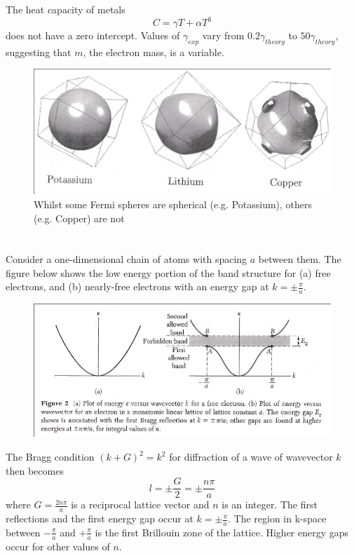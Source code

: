 \documentclass[a4paper, 11pt, normalem]{report}
\begin{document}
The heat capacity of metals
\begin{equation}
    C = \gamma T + \alpha T^3
\end{equation}
does not have a zero intercept.
Values of $\gamma_{exp}$ vary from $0.2\gamma_{theory}$ to $50\gamma_{theory}$, suggesting that $m$, the electron mass, is a variable. 
\begin{figure}[H]
    \centering
    \includegraphics[scale=0.4]{spheres.png}
    \caption{Whilst some Fermi spheres are spherical (e.g. Potassium), others (e.g. Copper) are not}
\end{figure}

\chapter{}
Consider a one-dimensional chain of atoms with spacing $a$ between them. 
The figure below shows the low energy portion of the band structure for (a) free electrons, and (b) nearly-free electrons with an energy gap at $k = \pm \frac{\pi}{a}$.
\begin{figure}[H]
    \centering
    \includegraphics[scale=0.5]{brill.png}
\end{figure}
The Bragg condition $(k+G)^2 = k^2$ for diffraction of a wave of wavevector $k$ then becomes 
\begin{equation}
    l = \pm \frac{G}{2} = \pm \frac{n\pi}{a}
\end{equation}
where $G = \frac{2n\pi}{a}$ is a reciprocal lattice vector and $n$ is an integer.
The first reflections and the first energy gap occur at $k = \pm \frac{\pi}{a}$.
The region in k-space between $-\frac{\pi}{a}$ and $+\frac{\pi}{a}$ is the first Brillouin zone of the lattice.
Higher energy gaps occur for other values of $n$.
\end{document}
